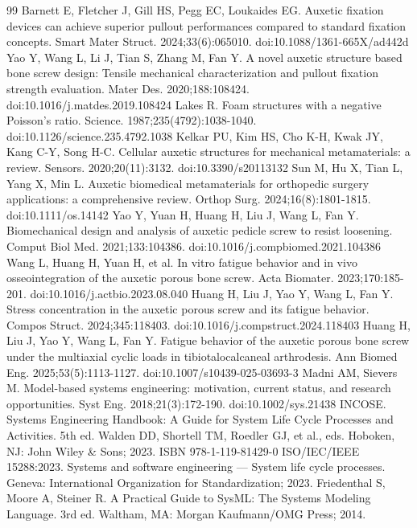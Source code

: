 \documentclass[10pt,twocolumn,letterpaper]{article}
\begin{document}
\begingroup\footnotesize\setlength{\parskip}{1.5pt}
\begin{thebibliography}{99}
\setlength{\itemsep}{1.5pt}
 Barnett E, Fletcher J, Gill HS, Pegg EC, Loukaides EG. Auxetic fixation devices can achieve superior pullout performances compared to standard fixation concepts. Smart Mater Struct. 2024;33(6):065010. doi:10.1088/1361-665X/ad442d
 Yao Y, Wang L, Li J, Tian S, Zhang M, Fan Y. A novel auxetic structure based bone screw design: Tensile mechanical characterization and pullout fixation strength evaluation. Mater Des. 2020;188:108424. doi:10.1016/j.matdes.2019.108424
 Lakes R. Foam structures with a negative Poisson's ratio. Science. 1987;235(4792):1038-1040. doi:10.1126/science.235.4792.1038
 Kelkar PU, Kim HS, Cho K-H, Kwak JY, Kang C-Y, Song H-C. Cellular auxetic structures for mechanical metamaterials: a review. Sensors. 2020;20(11):3132. doi:10.3390/s20113132
 Sun M, Hu X, Tian L, Yang X, Min L. Auxetic biomedical metamaterials for orthopedic surgery applications: a comprehensive review. Orthop Surg. 2024;16(8):1801-1815. doi:10.1111/os.14142
 Yao Y, Yuan H, Huang H, Liu J, Wang L, Fan Y. Biomechanical design and analysis of auxetic pedicle screw to resist loosening. Comput Biol Med. 2021;133:104386. doi:10.1016/j.compbiomed.2021.104386
 Wang L, Huang H, Yuan H, et al. In vitro fatigue behavior and in vivo osseointegration of the auxetic porous bone screw. Acta Biomater. 2023;170:185-201. doi:10.1016/j.actbio.2023.08.040
 Huang H, Liu J, Yao Y, Wang L, Fan Y. Stress concentration in the auxetic porous screw and its fatigue behavior. Compos Struct. 2024;345:118403. doi:10.1016/j.compstruct.2024.118403
 Huang H, Liu J, Yao Y, Wang L, Fan Y. Fatigue behavior of the auxetic porous bone screw under the multiaxial cyclic loads in tibiotalocalcaneal arthrodesis. Ann Biomed Eng. 2025;53(5):1113-1127. doi:10.1007/s10439-025-03693-3
 Madni AM, Sievers M. Model-based systems engineering: motivation, current status, and research opportunities. Syst Eng. 2018;21(3):172-190. doi:10.1002/sys.21438
 INCOSE. Systems Engineering Handbook: A Guide for System Life Cycle Processes and Activities. 5th ed. Walden DD, Shortell TM, Roedler GJ, et al., eds. Hoboken, NJ: John Wiley \& Sons; 2023. ISBN 978-1-119-81429-0
 ISO/IEC/IEEE 15288:2023. Systems and software engineering --- System life cycle processes. Geneva: International Organization for Standardization; 2023.
 Friedenthal S, Moore A, Steiner R. A Practical Guide to SysML: The Systems Modeling Language. 3rd ed. Waltham, MA: Morgan Kaufmann/OMG Press; 2014.

\end{thebibliography}
\end{document}
